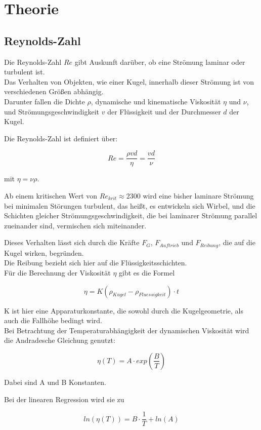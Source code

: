 \section{Theorie}
\label{sec:Theorie}

\subsection{Reynolds-Zahl}
\label{subsec:Reynolds-Zahl}

Die Reynolds-Zahl $Re$ gibt Auskunft darüber, ob eine Strömung laminar oder turbulent ist. \\
Das Verhalten von Objekten, wie einer Kugel, innerhalb dieser Strömung ist von verschiedenen Größen abhängig.\\
Darunter fallen die Dichte $\rho$, dynamische und kinematische Viskosität $\eta$ und $\nu$, 
und Strömungsgeschwindigkeit $v$ der Flüssigkeit 
und der Durchmesser $d$ der Kugel.

Die Reynolds-Zahl ist definiert über: 

\begin{equation}
    \label{eqn:Reynolds}
    Re = \frac{\rho v d }{\eta} = \frac{v d }{\nu}
\end{equation}

mit $\eta = \nu \rho$.

Ab einem kritischen Wert von $Re_{krit} \approx 2300$ wird eine bisher laminare Strömung bei 
minimalen Störungen turbulent, das heißt, es entwickeln sich Wirbel, und die Schichten gleicher Strömungsgeschwindigkeit, 
die bei laminarer Strömung parallel zueinander sind, vermischen sich miteinander.

Dieses Verhalten lässt sich durch die Kräfte $F_G$, $F_{Auftrieb}$ und $F_{Reibung}$, die auf die Kugel wirken, begründen.\\
Die Reibung bezieht sich hier auf die Flüssigkeitsschichten. \\

Für die Berechnung der Viskosität $\eta$ gibt es die Formel 

\begin{equation}
    \label{eqn:Eta}
    \eta = K (\rho_{Kugel} - \rho_{Fluessigkeit}) \cdot t
\end{equation}

K ist hier eine Apparaturkonstante, die sowohl durch die Kugelgeometrie, als auch die Fallhöhe bedingt wird.\\



Bei Betrachtung der Temperaturabhängigkeit der dynamischen Viskosität wird die Andradesche Gleichung genutzt:

\begin{equation}
    \label{eqn:Andrad}
    \eta(T) = A \cdot exp(\frac{B}{T})
\end{equation}

Dabei sind A und B Konstanten.

Bei der linearen Regression wird sie zu

\begin{equation}
    \label{eqn:AndradLin}
    ln(\eta(T)) = B \cdot \frac{1}{T} + ln(A)
\end{equation}
